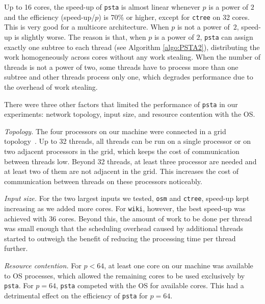 Up to 16 cores, the speed-up of {\tt psta} is almost linear whenever $p$ is a
power of $2$ and the efficiency (speed-up/$p$) is 70\% or higher, except for
{\tt ctree} on 32 cores.
This is very good for a multicore architecture.
When $p$ is not a power of~$2$, speed-up is slightly worse.
The reason is that, when $p$ is a power of $2$, {\tt psta} can assign exactly
one subtree to each thread (see Algorithm \ref{algo:PSTA2}), distributing the
work homogeneously across cores without any work stealing.
When the number of threads is not a power of two, some threads have to process
more than one subtree and other threads process only one, which degrades
performance due to the overhead of work stealing.

There were three other factors that limited the performance of {\tt psta} in
our experiments: network topology, input size, and resource contention with
the OS.

\textit{Topology.}
The four processors on our machine were connected in a grid
topology~\cite{Drepper2007}.
Up to 32 threads, all threads can be run on a single processor or on two
adjacent processors in the grid, which keeps the cost of communication between
threads low.
Beyond 32 threads, at least three processor are needed and
at least two of them are not adjacent in the grid.
This increases the cost of communication between threads on these processors
noticeably.

\textit{Input size.}
For the two largest inputs we tested, {\tt osm} and {\tt ctree}, speed-up
kept increasing as we added more cores.
For {\tt wiki}, however, the best speed-up was achieved with 36 cores.
Beyond this, the amount of work to be done per thread was small enough that
the scheduling overhead caused by additional threads started to outweigh the
benefit of reducing the processing time per thread further.

\textit{Resource contention.}
For $p < 64$, at least one core on our machine was available to OS processes,
which allowed the remaining cores to be used exclusively by {\tt psta}.
For $p = 64$, {\tt psta} competed with the OS for available cores.
This had a detrimental effect on the efficiency of {\tt psta} for $p = 64$.

